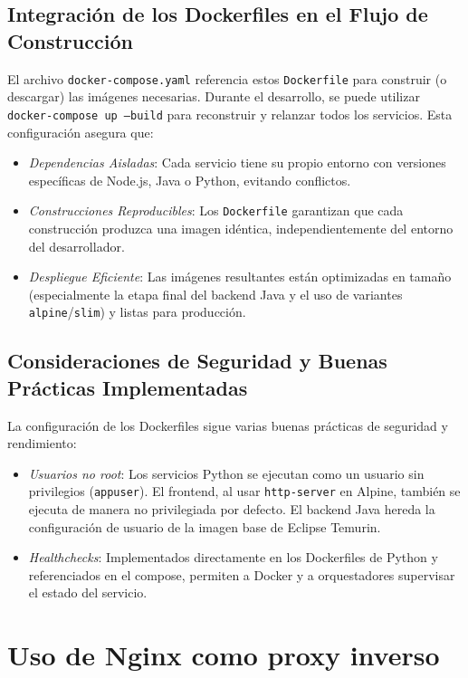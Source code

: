 \documentclass{article}
\begin{document}
\subsection{Integración de los Dockerfiles en el Flujo de Construcción}
El archivo \texttt{docker-compose.yaml} referencia estos \texttt{Dockerfile} para construir (o descargar) las imágenes necesarias. Durante el desarrollo, se puede utilizar \texttt{docker-compose up --build} para reconstruir y relanzar todos los servicios. Esta configuración asegura que:

\begin{itemize}
\item \textit{Dependencias Aisladas}: Cada servicio tiene su propio entorno con versiones específicas de Node.js, Java o Python, evitando conflictos.
\item \textit{Construcciones Reproducibles}: Los \texttt{Dockerfile} garantizan que cada construcción produzca una imagen idéntica, independientemente del entorno del desarrollador.
\item \textit{Despliegue Eficiente}: Las imágenes resultantes están optimizadas en tamaño (especialmente la etapa final del backend Java y el uso de variantes \texttt{alpine}/\texttt{slim}) y listas para producción.
\end{itemize}

\subsection{Consideraciones de Seguridad y Buenas Prácticas Implementadas}
La configuración de los Dockerfiles sigue varias buenas prácticas de seguridad y rendimiento:

\begin{itemize}
\item \textit{Usuarios no root}: Los servicios Python se ejecutan como un usuario sin privilegios (\texttt{appuser}). El frontend, al usar \texttt{http-server} en Alpine, también se ejecuta de manera no privilegiada por defecto. El backend Java hereda la configuración de usuario de la imagen base de Eclipse Temurin.
\item \textit{Healthchecks}: Implementados directamente en los Dockerfiles de Python y referenciados en el compose, permiten a Docker y a orquestadores supervisar el estado del servicio.
\end{itemize}

\section{Uso de Nginx como proxy inverso}
\end{document}
